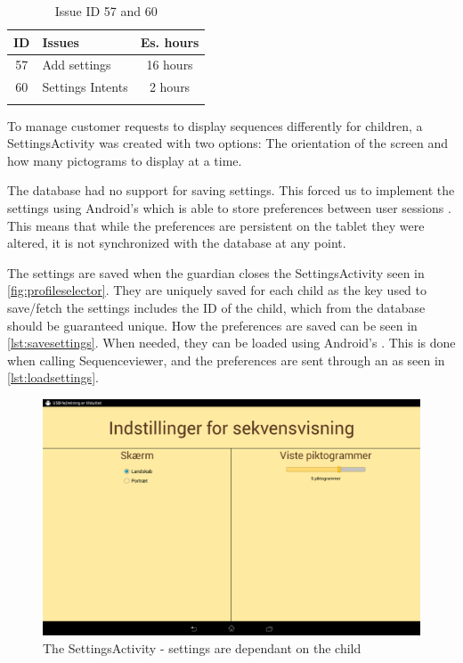 \begin{longtable} { | c | p{12cm} | c | } 
\hline
	ID 	&	Issues	&		 Es. hours \\\hline
	57	&	Add settings	&	16 hours	\\\hline
	60	&	Settings Intents & 2 hours \\\hline
\caption{Issue ID 57 and 60}
\label{tab:spr4_addsettings}
\end{longtable}

To manage customer requests to display sequences differently for children, a SettingsActivity was created with two options: The orientation of the screen and how many pictograms to display at a time.

The database had no support for saving settings. This forced us to implement the settings using Android's  which is able to store preferences between user sessions \cite{sharedpreferences}. This means that while the preferences are persistent on the tablet they were altered, it is not synchronized with the database at any point.

The settings are saved when the guardian closes the SettingsActivity seen in \ref{fig:profileselector}. They are uniquely saved for each child as the key used to save/fetch the settings includes the ID of the child, which from the database should be guaranteed unique. How the preferences are saved can be seen in \ref{lst:savesettings}. When needed, they can be loaded using Android's . This is done when calling Sequenceviewer, and the preferences are sent through an  as seen in \ref{lst:loadsettings}.

\begin{figure}[H]
	\centering
	\includegraphics[width=\textwidth]{Pics/Sprint4/settings.png}
	\caption{The SettingsActivity - settings are dependant on the child}
	\label{fig:settingsactivity}
\end{figure}

